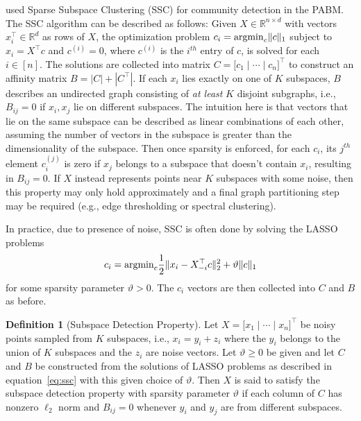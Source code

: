 \documentclass[
  11pt,
]{article}
\theoremstyle{definition}
\newtheorem{definition}{Definition}[section]
\theoremstyle{definition}
\theoremstyle{definition}
\theoremstyle{definition}
\theoremstyle{remark}
\begin{document}
\cite{noroozi2019estimation} used Sparse Subspace Clustering (SSC)
\citep{5206547} for community detection in the PABM.
The SSC algorithm can be described as follows:
Given \(X \in \mathbb{R}^{n \times d}\) with vectors
\(x_i^\top \in \mathbb{R}^d\) as rows of \(X\), the optimization problem
\(c_i = \mathrm{argmin}_{c} \|c\|_1\) subject to \(x_i = X^\top c\) and
\(c^{(i)} = 0\), where \(c^{(i)}\) is the \(i^{th}\) entry of \(c\), is solved for each \(i \in [n]\).
The solutions are collected into matrix
\(C = \bigl[ c_1 \mid \cdots \mid c_n \bigr]^\top\) to
construct an affinity matrix \(B = |C| + |C^\top|\). If each \(x_i\) lies
exactly on one of \(K\) subspaces, \(B\) describes an undirected graph
consisting of \emph{at least} \(K\) disjoint subgraphs, i.e., \(B_{ij} = 0\) if \(x_i, x_j\) lie on different subspaces.
The intuition here is that vectors that lie on the same subspace can be described as linear combinations of each other, assuming the number of vectors in the subspace is greater than the dimensionality of the subspace.
Then once sparsity is enforced, for each \(c_i\), its \(j^{th}\) element \(c_i^{(j)}\) is zero if \(x_j\) belongs to a subspace that doesn't contain \(x_i\), resulting in \(B_{ij} = 0\).
If \(X\) instead represents points near \(K\) subspaces with some noise,
then this property may only hold approximately and a final graph partitioning step may be required
(e.g., edge thresholding or spectral clustering).

In practice, due to presence of noise, SSC is often done by solving the LASSO problems
\begin{equation} 
\label{eq:ssc}
c_i = \mathrm{argmin}_c \frac{1}{2} \|x_i - X_{-i}^\top c\|^2_2 + \vartheta \|c\|_1
\end{equation}
for some sparsity parameter \(\vartheta > 0\).
The \(c_i\) vectors are then collected into \(C\) and \(B\) as before.

\begin{definition}[Subspace Detection Property]
\label{def:subspace_detection}
Let $X = \bigl[ x_1 \mid \cdots \mid x_n \bigr]^\top$ be noisy points sampled from $K$ subspaces, i.e., $x_i = y_i + z_i$ where the $y_i$ belongs to the union of $K$ subspaces and the $z_i$ are noise vectors. 
Let $\vartheta \geq 0$ be given and let $C$ and $B$ be constructed from the solutions of LASSO problems as described in equation~\ref{eq:ssc} with this given choice of $\vartheta$. 
Then $X$ is said to satisfy the subspace detection property with sparsity parameter $\vartheta$ if each column of $C$ has nonzero $\ell_2$ norm and $B_{ij} = 0$ whenever $y_i$ and $y_j$ are from different subspaces.
\end{definition}
\end{document}
